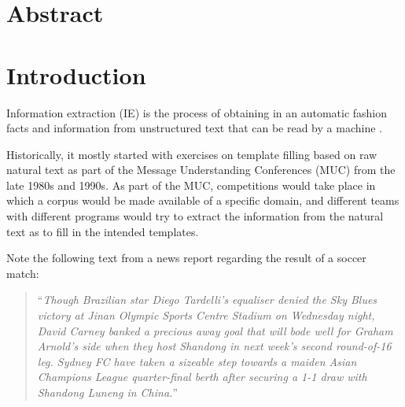 \documentclass[11pt,a4paper,openright]{memoir}
\title{\theTitle}
\author{\theAuthor}
\begin{document}
\setlength\parindent{24pt}
\captionnamefont{\bfseries}

\frontmatter

\makeunswfrontmatter

\newpage
\thispagestyle{empty}
\strut
\vfill


\chapter*{Abstract}

\clearpage
\tableofcontents

\cleardoublepage

\mainmatter

\chapter{Introduction}
Information extraction (IE) is the process of obtaining in an automatic fashion facts and information from unstructured text that can be read by a machine \cite{Jurafsky:2000:SLP:555733}.

Historically, it mostly started with exercises on template filling based on raw natural text \cite{Moens:2006:IEA:1177314} as part of the Message Understanding Conferences (MUC) from the late 1980s and 1990s. As part of the MUC, competitions would take place in which a corpus would be made available of a specific domain, and different teams with different programs would try to extract the information from the natural text as to fill in the intended templates.

Note the following text from a news report regarding the result of a soccer match:

\blockquote{\enquote{\emph{Though Brazilian star Diego Tardelli's equaliser denied the Sky Blues victory at Jinan Olympic Sports Centre Stadium on Wednesday night, David Carney banked a precious away goal that will bode well for Graham Arnold's side when they host Shandong in next week's second round-of-16 leg. Sydney FC have taken a sizeable step towards a maiden Asian Champions League quarter-final berth after securing a 1-1 draw with Shandong Luneng in China.}}}
\end{document}
